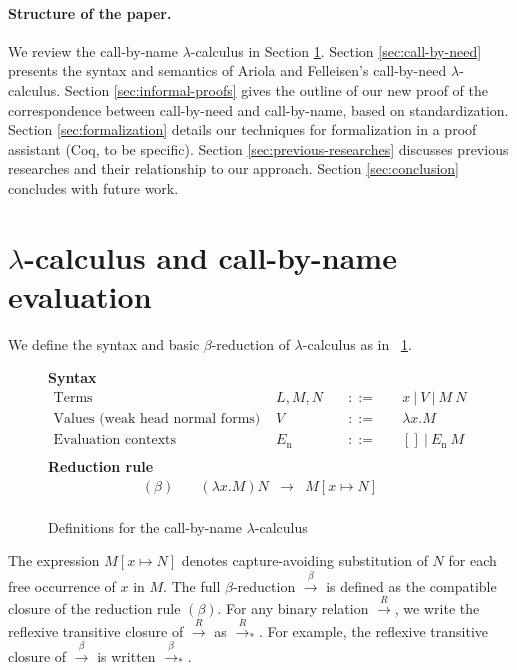 \documentclass{llncs}
\newcommand{\FULLBETA}{\xrightarrow{\beta}}
\newcommand{\RTCLOS}[1]{#1_*}
\begin{document}
\paragraph*{Structure of the paper.}
We review the call-by-name $\lambda$-calculus in Section \ref{sec:call-by-name}.
Section \ref{sec:call-by-need} presents the syntax and semantics of Ariola and Felleisen's call-by-need $\lambda$-calculus.
Section \ref{sec:informal-proofs} gives the outline of our new proof of the correspondence between call-by-need and call-by-name, based on standardization.
Section \ref{sec:formalization} details our techniques for formalization in a proof assistant (Coq, to be specific).
Section \ref{sec:previous-researches} discusses previous researches and their relationship to our approach.
Section \ref{sec:conclusion} concludes with future work.
%
\section{$\lambda$-calculus and call-by-name evaluation}\label{sec:call-by-name}

We define the syntax and basic $\beta$-reduction of $\lambda$-calculus as in \figurename~\ref{call-by-name-lambda-calculus}.
%
\begin{figure}[tp]
	\textbf{Syntax}
	\[ \begin{array}{llcl}
		\mbox{Terms}\quad & L,M,N\quad & ::=\quad & x~|~V~|~M~N \\
		\mbox{Values (weak head normal forms)}\quad & V\quad & ::=\quad & \lambda x.M \\
		\mbox{Evaluation contexts}\quad & E_\mathrm{n}\quad & ::=\quad & [] ~|~ E_\mathrm{n}~M \\
	\end{array} \]
	\textbf{Reduction rule}
	\[ \begin{array}{lrcl}
		(\beta)\quad & (\lambda x.M)N & \rightarrow & M[x \mapsto N] \\
	\end{array} \]
	\caption{Definitions for the call-by-name $\lambda$-calculus}
	\label{call-by-name-lambda-calculus}
\end{figure}
%
The expression $M[x\mapsto N]$ denotes capture-avoiding substitution of $N$ for each free occurrence of $x$ in $M$.
The full $\beta$-reduction $\FULLBETA$ is defined as the compatible closure of the reduction rule $(\beta)$.
For any binary relation $\xrightarrow{R}$, we write the reflexive transitive closure of $\xrightarrow{R}$ as $\xrightarrow{R}_*$.
For example, the reflexive transitive closure of $\FULLBETA$ is written $\RTCLOS{\FULLBETA}$.
\end{document}
